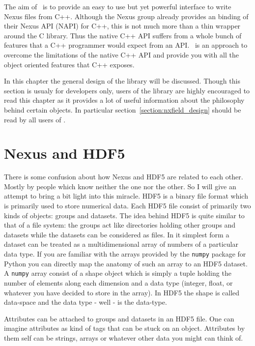
The aim of \pninx\ is to provide an easy to use but yet powerful interface
to write Nexus files from C++. Although the Nexus group already provides 
an binding of their Nexus API (NAPI) for C++, this is not much more than a 
thin wrapper around the C library. Thus the native C++ API suffers from 
a whole bunch of features that a C++ programmer would expect from an API. 
\pninx\ is an approach to overcome the limitations of the native C++ API 
and provide you with all the object oriented features that C++ exposes.

In this chapter the general design of the library will be discussed. 
Though this section is usualy for developers only, users of the library 
are highly encouraged to read this chapter as it provides a lot of useful 
information about the philosophy behind certain objects. In particular 
section~\ref{section:nxfield_design} should be read by all users of \pninx. 

\section{Nexus and HDF5}

There is some confusion about how Nexus and HDF5 are related to each other. 
Mostly by people which know neither the one nor the other. 
So I will give an attempt to bring a bit light into this miracle. 
HDF5 is a binary file format which is primarily used to store numerical data. 
Each HDF5 file consist of primarily two kinds of objects: groups and datasets. 
The idea behind HDF5 is quite similar to that of a file system: the groups 
act like directories holding other groups and datasets while the datasets 
can be considered as files. In it simplest form a dataset can be treated as a 
multidimensional array of numbers of a particular data type. 
If you are familiar with the arrays provided by the {\tt numpy} package 
for Python you can directly map the anatomy of such an array to an HDF5 dataset. 
A {\tt numpy} array consist of a shape object which is simply a tuple holding 
the number of elements along each dimension and a data type (integer, float, or
whatever you have decided to store in the array). In HDF5 the shape is 
called data-space and the data type - well - is the data-type. 

Attributes can be attached to groups and datasets in an HDF5 file. One  can
imagine attributes as kind of tags that can be stuck on an object. 
Attributes by them self can be strings, arrays or whatever other data you might 
can think of. 


